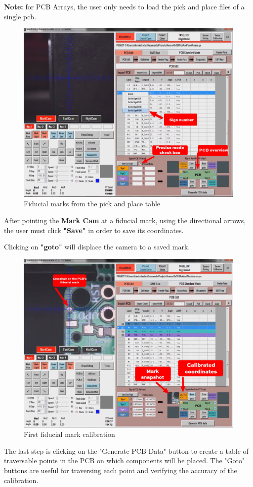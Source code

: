 \documentclass[a4paper,10pt]{report}
\begin{document}
\textbf{Note:} for PCB Arrays, the user only needs to load the pick and place files of a single pcb.
\begin{figure}[!htb]
 \centering
 \includegraphics[width=1\textwidth]{scrot5.png}
 \caption{Fiducial marks from the pick and place table}
\end{figure}

\newpage
After pointing the \textbf{Mark Cam} at a fiducial mark, using the directional arrows, the user must click \textbf{"Save"} in order to save its coordinates.

Clicking on \textbf{"goto"} will displace the camera to a saved mark.\\
\begin{figure}[!htb]
 \centering
 \includegraphics[width=1\textwidth]{scrot6.png}
 \caption{First fiducial mark calibration}
\end{figure}
\newpage
The last step is clicking on the "Generate PCB Data" button to create a table of traversable points in the PCB on which components will be placed. The "Goto" buttons are useful for traversing each point and verifying the accuracy of the calibration.\\
\end{document}
